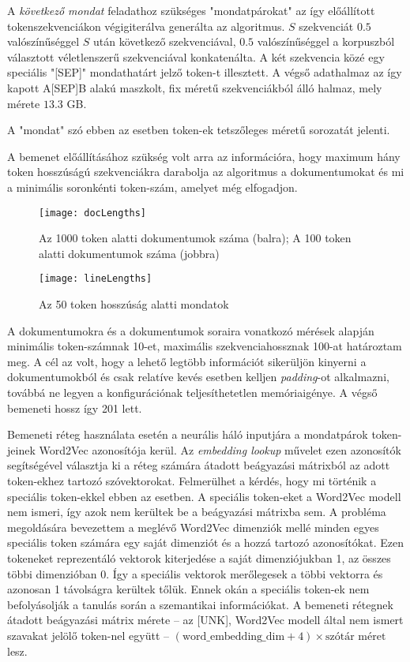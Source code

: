 A \textit{következő mondat} feladathoz szükséges "mondatpárokat" az így előállított tokenszekvenciákon végigiterálva generálta az algoritmus. $S$ szekvenciát $0.5$ valószínűséggel $S$ után következő szekvenciával, $0.5$ valószínűséggel a korpuszból választott véletlenszerű szekvenciával konkatenálta. A két szekvencia közé egy speciális "[SEP]" mondathatárt jelző token-t illesztett. A végső adathalmaz az így kapott A[SEP]B alakú maszkolt, fix méretű szekvenciákból álló halmaz, mely mérete $13.3$ GB.

\begin{note}
A "mondat" szó ebben az esetben token-ek tetszőleges méretű sorozatát jelenti.
\end{note}
 
A bemenet előállításához szükség volt arra az információra, hogy maximum hány token hosszúságú szekvenciákra darabolja az algoritmus a dokumentumokat és mi a minimális soronkénti token-szám, amelyet még elfogadjon. 

\begin{figure}[H]
	\centering
	\texttt{[image: docLengths]}
	\caption{Az 1000 token alatti dokumentumok száma (balra); A 100 token alatti dokumentumok száma (jobbra)}
\end{figure}

\begin{figure}[H]
	\centering
	\texttt{[image: lineLengths]}
	\caption{Az 50 token hosszúság alatti mondatok}
\end{figure}

A dokumentumokra és a dokumentumok soraira vonatkozó mérések alapján minimális token-számnak 10-et, maximális szekvenciahossznak 100-at határoztam meg. A cél az volt, hogy a lehető legtöbb információt sikerüljön kinyerni a dokumentumokból és csak relatíve kevés esetben kelljen \textit{padding}-ot alkalmazni, továbbá ne legyen a konfigurációnak teljesíthetetlen memóriaigénye. A végső bemeneti hossz így 201 lett.

Bemeneti réteg használata esetén a neurális háló inputjára a mondatpárok token-jeinek Word2Vec azonosítója kerül. Az \textit{embedding lookup} művelet ezen azonosítók segítségével választja ki a réteg számára átadott beágyazási mátrixból az adott token-ekhez tartozó szóvektorokat. Felmerülhet a kérdés, hogy mi történik a speciális token-ekkel ebben az esetben. A speciális token-eket a Word2Vec modell nem ismeri, így azok nem kerültek be a beágyazási mátrixba sem. A probléma megoldására bevezettem a meglévő Word2Vec dimenziók mellé minden egyes speciális token számára egy saját dimenziót és a hozzá tartozó azonosítókat. Ezen tokeneket reprezentáló vektorok kiterjedése a saját dimenziójukban 1, az összes többi dimenzióban 0. Így a speciális vektorok merőlegesek a többi vektorra és azonosan 1 távolságra kerültek tőlük. Ennek okán a speciális token-ek nem befolyásolják a tanulás során a szemantikai információkat. A bemeneti rétegnek átadott beágyazási mátrix mérete – az [UNK], Word2Vec modell által nem ismert szavakat jelölő token-nel együtt – $(\text{word\_embedding\_dim} + 4) \times \text{szótár méret} $ lesz.

